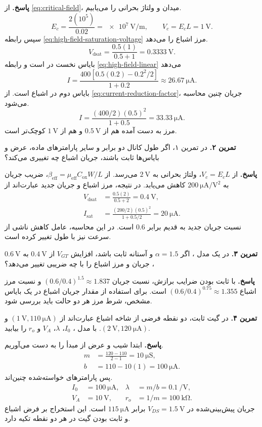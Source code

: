 \textbf{پاسخ.}
از \eqref{eq:critical-field}، میدان و ولتاژ بحرانی را می‌یابیم.
\[
 E_c=\frac{2(10^5)}{0.02}=\qty{e7}{\volt\per\metre},\qquad
 V_c=E_cL=\qty{1}{\volt}.
\]
سپس رابطه \eqref{eq:high-field-saturation-voltage} مرز اشباع را می‌دهد.
\[
 V_{\mathrm{dsat}}=\frac{0.5(1)}{0.5+1}=\qty{0.3333}{\volt}.
\]
بایاس نخست در  است و رابطه \eqref{eq:high-field-linear}
می‌دهد
\[
 I=\frac{400[0.5(0.2)-0.2^2/2]}{1+0.2}
 \approx\qty{26.67}{\micro\ampere}.
\]
بایاس دوم در اشباع است. از \eqref{eq:current-reduction-factor}،
جریان چنین محاسبه می‌شود.
\[
 I=\frac{(400/2)(0.5)^2}{1+0.5}=\qty{33.33}{\micro\ampere}.
\]
مرز به دست آمده هم از \(\qty{0.5}{\volt}\) و هم از
\(\qty{1}{\volt}\) کوچک‌تر است.

\textbf{تمرین ۲.}
در تمرین ۱، اگر طول کانال دو برابر و سایر پارامترهای ماده، عرض و بایاس‌ها
ثابت باشند، جریان اشباع چه تغییری می‌کند؟

\textbf{پاسخ.}
از \(V_c=E_cL\)، ولتاژ بحرانی به \(\qty{2}{\volt}\) می‌رسد.
از \(\beta_{\mathrm{eff}}=\mu_{\mathrm{eff}}C_{\mathrm{ox}}W/L\)،
ضریب جریان به \(\qty{200}{\micro\ampere\per\volt\squared}\) کاهش
می‌یابد. در نتیجه، مرز اشباع و جریان جدید عبارت‌اند از
\[
 \begin{aligned}
 V_{\mathrm{dsat}}&=\frac{0.5(2)}{0.5+2}=\qty{0.4}{\volt},\\
 I_{\mathrm{sat}}&=\frac{(200/2)(0.5)^2}{1+0.5/2}=\qty{20}{\micro\ampere}.
 \end{aligned}
\]
نسبت جریان جدید به قدیم برابر \(0.6\)
است. در این محاسبه، عامل کاهش ناشی از سرعت نیز با طول تغییر کرده است.

\textbf{تمرین ۳.}
در یک مدل ، اگر \(\alpha=1.5\) و آستانه ثابت باشد،
افزایش \(V_{GT}\) از \(\qty{0.4}{\volt}\) به \(\qty{0.6}{\volt}\)،
جریان و مرز اشباع را با چه ضریبی تغییر می‌دهد؟

\textbf{پاسخ.}
با ثابت بودن ضرایب برازش، نسبت جریان
\((0.6/0.4)^{1.5}\approx1.837\) و نسبت مرز اشباع
\((0.6/0.4)^{0.75}\approx1.355\) است. برای استفاده از مقدار جریان
اشباع در یک بایاس  مشخص، شرط مرز هر دو حالت باید بررسی شود.

\textbf{تمرین ۴.}
در گیت ثابت، دو نقطه فرضی از شاخه اشباع عبارت‌اند از
\((\qty{1}{\volt},\qty{110}{\micro\ampere})\) و
\((\qty{2}{\volt},\qty{120}{\micro\ampere})\).
با مدل ، \(I_0\)، \(\lambda\)، \(V_A\) و \(r_o\) را بیابید.

\textbf{پاسخ.}
ابتدا شیب و عرض از مبدأ را به دست می‌آوریم.
\[
 \begin{aligned}
 m&=\frac{120-110}{2-1}=\qty{10}{\micro\siemens},\\
 b&=110-10(1)=\qty{100}{\micro\ampere}.
 \end{aligned}
\]
پس پارامترهای خواسته‌شده چنین‌اند.
\[
 \begin{aligned}
 I_0&=\qty{100}{\micro\ampere},&
 \lambda&=m/b=\qty{0.1}{\per\volt},\\
 V_A&=\qty{10}{\volt},&
 r_o&=1/m=\qty{100}{\kilo\ohm}.
 \end{aligned}
\]
جریان پیش‌بینی‌شده در \(V_{DS}=\qty{1.5}{\volt}\) برابر
\(\qty{115}{\micro\ampere}\) است. این استخراج بر فرض اشباع و ثابت
بودن گیت در هر دو نقطه تکیه دارد.

